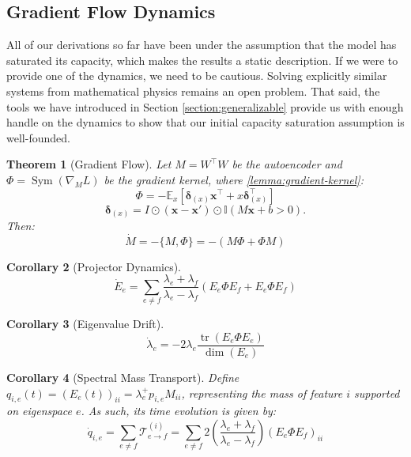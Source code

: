 \documentclass{article}
\theoremstyle{plain}
\newtheorem{theorem}{Theorem}
\newtheorem{corollary}[theorem]{Corollary}
\numberwithin{equation}{section}
\theoremstyle{definition}
\theoremstyle{remark}
\begin{document}
\subsection{Gradient Flow Dynamics}
All of our derivations so far have been under the assumption that the model has saturated its capacity, which makes the results a static description. If we were to provide one of the dynamics, we need to be cautious. Solving explicitly similar systems from mathematical physics \cite{thomson, smale} remains an open problem. That said, the tools we have introduced in Section \ref{section:generalizable} provide us with enough handle on the dynamics to show that our initial capacity saturation assumption is well-founded. 
\begin{theorem}[Gradient Flow]
    Let $M=W^\top W$ be the autoencoder and $\Phi = \operatorname{Sym}(\nabla_ML)$ be the gradient kernel, where \ref{lemma:gradient-kernel}: 
    $$\Phi=-\mathbb{E}_x [\boldsymbol{\delta}_{(x)}\mathbf{x}^\top + x \pmb{\delta}_{(x)}^\top]$$$$
\boldsymbol{\delta}_{(x)} = I \odot (\mathbf{x} - \mathbf{x}') \odot \mathbb{I}(M\mathbf{x} + b > 0).
$$
    Then: \begin{equation}
        \dot M = -\{M, \Phi\} = -(M\Phi + \Phi M)
    \end{equation}
\end{theorem}
\begin{corollary}[Projector Dynamics]
\begin{equation}\dot{E}_e = \sum_{e \neq f} \frac{\lambda_e + \lambda_f}{\lambda_e - \lambda_f} \left( E_e \Phi E_f + E_e \Phi E_f \right)\end{equation}
\end{corollary}

\begin{corollary}[Eigenvalue Drift]

\begin{equation}\dot{\lambda}_e = -2\lambda_e \frac{\operatorname{tr}(E_e \Phi E_e)}{\dim(E_e)}\end{equation}
\end{corollary}
\begin{corollary}[Spectral Mass Transport]Define $q_{i,e}(t) = (E_e(t))_{ii} = \lambda_e^+p_{i,e}M_{ii}$, representing the mass of feature $i$ supported on eigenspace $e$. As such, its time evolution is given by:
    \begin{equation}
        \dot{q}_{i, e} = \sum_{e \neq f} \mathcal{T}_{e \to f}^{(i)}= \sum_{e\neq f} 2 \left( \frac{\lambda_e + \lambda_f}{\lambda_e - \lambda_f} \right) (E_e \Phi E_f)_{ii}\end{equation}
\end{corollary}
\end{document}
